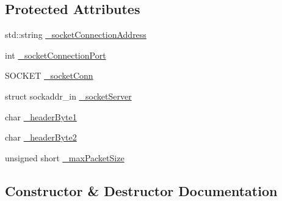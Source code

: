 \subsection*{Protected Attributes}
\begin{DoxyCompactItemize}
\item 
std\+::string \hyperlink{classCSocketOutConnection_a84876c61143ce6ebf83082824ca1d232}{\+\_\+socket\+Connection\+Address}
\item 
int \hyperlink{classCSocketOutConnection_a760902b8101aca205a3556020bc7bc50}{\+\_\+socket\+Connection\+Port}
\item 
S\+O\+C\+K\+ET \hyperlink{classCSocketOutConnection_a99dd605a5c9c6f635038213610447ac8}{\+\_\+socket\+Conn}
\item 
struct sockaddr\+\_\+in \hyperlink{classCSocketOutConnection_a7a4a2efbc8fced507bd76b88c2725af3}{\+\_\+socket\+Server}
\item 
char \hyperlink{classCSocketOutConnection_a35064c765760c0088efc66089090bf2c}{\+\_\+header\+Byte1}
\item 
char \hyperlink{classCSocketOutConnection_a47f6cf4d96b6a829190e37067c6e17f0}{\+\_\+header\+Byte2}
\item 
unsigned short \hyperlink{classCSocketOutConnection_a4df79b453417a21cd75b94d639410501}{\+\_\+max\+Packet\+Size}
\end{DoxyCompactItemize}


\subsection{Constructor \& Destructor Documentation}
